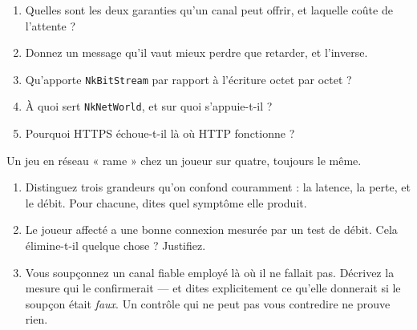 \begin{nkquestions}
\begin{enumerate}
\item Quelles sont les deux garanties qu'un canal peut offrir, et laquelle coûte
      de l'attente ?
\item Donnez un message qu'il vaut mieux perdre que retarder, et l'inverse.
\item Qu'apporte \texttt{NkBitStream} par rapport à l'écriture octet par octet ?
\item À quoi sert \texttt{NkNetWorld}, et sur quoi s'appuie-t-il ?
\item Pourquoi HTTPS échoue-t-il là où HTTP fonctionne ?
\end{enumerate}
\end{nkquestions}

\begin{nklogique}
Un jeu en réseau « rame » chez un joueur sur quatre, toujours le même.

\begin{enumerate}
\item Distinguez trois grandeurs qu'on confond couramment : la latence, la perte,
      et le débit. Pour chacune, dites quel symptôme elle produit.
\item Le joueur affecté a une bonne connexion mesurée par un test de débit.
      Cela élimine-t-il quelque chose ? Justifiez.
\item Vous soupçonnez un canal fiable employé là où il ne fallait pas.
      Décrivez la mesure qui le confirmerait --- et dites explicitement ce
      qu'elle donnerait si le soupçon était \emph{faux}. Un contrôle qui ne peut
      pas vous contredire ne prouve rien.
\end{enumerate}
\end{nklogique}
